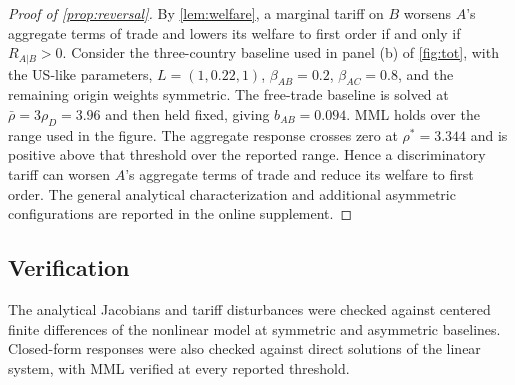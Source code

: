 \begin{proof}[Proof of \cref{prop:reversal}]
By \cref{lem:welfare}, a marginal tariff on $B$ worsens $A$'s aggregate terms of trade and lowers its welfare to first order if and only if $R_{A|B}>0$. Consider the three-country baseline used in panel (b) of \cref{fig:tot}, with the US-like parameters, $L=(1,0.22,1)$, $\beta_{AB}=0.2$, $\beta_{AC}=0.8$, and the remaining origin weights symmetric. The free-trade baseline is solved at $\bar\rho=3\rho_D=3.96$ and then held fixed, giving $b_{AB}=0.094$. MML holds over the range used in the figure. The aggregate response crosses zero at $\rho^*=3.344$ and is positive above that threshold over the reported range. Hence a discriminatory tariff can worsen $A$'s aggregate terms of trade and reduce its welfare to first order. The general analytical characterization and additional asymmetric configurations are reported in the online supplement.
\end{proof}

\subsection{Verification}

The analytical Jacobians and tariff disturbances were checked against centered finite differences of the nonlinear model at symmetric and asymmetric baselines. Closed-form responses were also checked against direct solutions of the linear system, with MML verified at every reported threshold.
